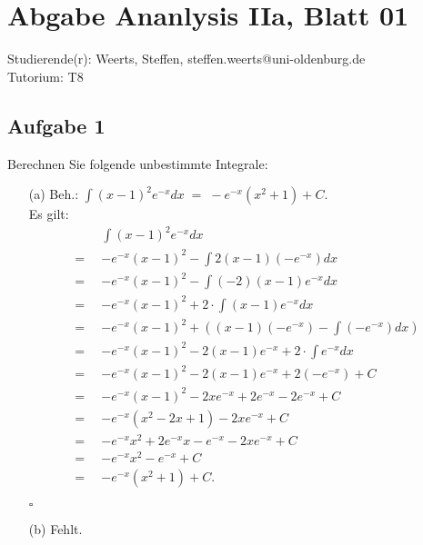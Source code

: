 \documentclass[12pt]{article}
\newcommand{\QED}{\begin{flushright} $\square$ \end{flushright}}
\begin{document}
\section*{Abgabe Ananlysis IIa, Blatt 01}
Studierende(r): Weerts, Steffen, steffen.weerts@uni-oldenburg.de \\
Tutorium: T8
\subsection*{Aufgabe 1}
Berechnen Sie folgende unbestimmte Integrale:
\begin{enumerate}
	\item[(a)] Beh.: ${\displaystyle \int (x-1)^2e^{-x} dx \; = \; -e^{-x}(x^2+1) + C }$. \\
	Es gilt:
	\begin{align*}
		&\int (x-1)^2e^{-x} dx \\
		= \enspace &-e^{-x}(x-1)^2 - \int 2(x-1)(-e^{-x}) dx \\
		= \enspace &-e^{-x}(x-1)^2 - \int (-2)(x-1)e^{-x} dx \\
		= \enspace &-e^{-x}(x-1)^2 + 2 \cdot \int (x-1)e^{-x} dx \\
		= \enspace &-e^{-x}(x-1)^2 + \left((x-1)(-e^{-x}) - \int (-e^{-x}) dx \right) \\
		= \enspace &-e^{-x}(x-1)^2 - 2(x-1)e^{-x} + 2 \cdot \int e^{-x} dx \\
		= \enspace &-e^{-x}(x-1)^2 - 2(x-1)e^{-x} + 2(-e^{-x}) + C \\
		= \enspace &-e^{-x}(x-1)^2 - 2xe^{-x} + 2e^{-x} - 2e^{-x} + C \\
		= \enspace &-e^{-x}(x^2-2x+1) - 2xe^{-x} + C \\
		= \enspace &-e^{-x}x^2 + 2e^{-x}x - e^{-x} - 2xe^{-x} + C \\
		= \enspace &-e^{-x}x^2 - e^{-x} + C \\
		= \enspace &-e^{-x}(x^2 + 1) + C.
	\end{align*}
	\QED
	
	\item[(b)] Fehlt.
	

\end{enumerate}
\end{document}
